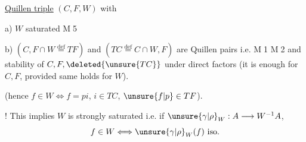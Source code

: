 \uline{Quillen triple} $(C,F,W)$ with


a) $W$ saturated  \textcircled{M5}


b) $(C,F\cap W\overset{\mathrm{def}}{=}TF)$ and $(TC\overset{\mathrm{def}}{=}C\cap W,F)$ are Quillen pairs i.e. \textcircled{M1} \textcircled{M2} and stability of $C,F,\deleted{\unsure{TC}}$    under direct factors (it is enough for $C,F$, provided same holds for \textcircled{$W$}).



(hence  $f\in W\Longleftrightarrow f=pi$, $i\in TC$, $\unsure{f|p}\in TF$).

! This implies $W$ is strongly saturated i.e. if $\unsure{\gamma|\rho}_W:A\longrightarrow W^{-1}A$,
\[
f\in W\Longleftrightarrow\unsure{\gamma|\rho}_W(f)\text{ iso}.
\]


